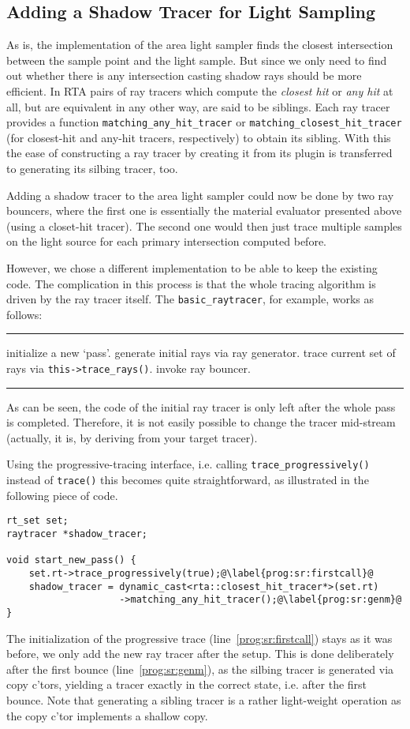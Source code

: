 \documentclass[a4paper,11pt]{scrartcl}
\newenvironment{alg}{
	\medskip\hrule
	\begin{algorithmic}}
	{\end{algorithmic}
	\hrule\medskip}
\begin{document}
\subsection{Adding a Shadow Tracer for Light Sampling}
As is, the implementation of the area light sampler finds the closest intersection between the sample point and the light sample.
But since we only need to find out whether there is any intersection casting shadow rays should be more efficient.
In RTA pairs of ray tracers which compute the \emph{closest hit} or \emph{any hit} at all, but are equivalent in any other way, are said to be siblings.
Each ray tracer provides a function \lstinline|matching_any_hit_tracer| or \lstinline|matching_closest_hit_tracer| 
	(for closest-hit and any-hit tracers, respectively) to obtain its sibling.
With this the ease of constructing a ray tracer by creating it from its plugin is transferred to generating its silbing tracer, too.

Adding a shadow tracer to the area light sampler could now be done by two ray bouncers, 
	where the first one is essentially the material evaluator presented above (using a closet-hit tracer).
The second one would then just trace multiple samples on the light source for each primary intersection computed before.

However, we chose a different implementation to be able to keep the existing code.
The complication in this process is that the whole tracing algorithm is driven by the ray tracer itself.
The \lstinline|basic_raytracer|, for example, works as follows:
\begin{alg}
\State initialize a new `pass'.
\State generate initial rays via ray generator.
\Repeat
	\State trace current set of rays via \lstinline|this->trace_rays()|.
	\State invoke ray bouncer.
\end{alg}
As can be seen, the code of the initial ray tracer is only left after the whole pass is completed.
Therefore, it is not easily possible to change the tracer mid-stream
	(actually, it is, by deriving from your target tracer).

Using the progressive-tracing interface, i.e. calling \lstinline|trace_progressively()| instead of \lstinline|trace()|
	this becomes quite straightforward, as illustrated in the following piece of code.
\begin{lstlisting}
rt_set set;
raytracer *shadow_tracer;

void start_new_pass() {
	set.rt->trace_progressively(true);@\label{prog:sr:firstcall}@
	shadow_tracer = dynamic_cast<rta::closest_hit_tracer*>(set.rt)
	                ->matching_any_hit_tracer();@\label{prog:sr:genm}@
}
\end{lstlisting}
The initialization of the progressive trace (line~\ref{prog:sr:firstcall}) stays as it was before,
	we only add the new ray tracer after the setup.
This is done deliberately after the first bounce (line~\ref{prog:sr:genm}), as the silbing tracer is generated via copy c'tors, 
	yielding a tracer exactly in the correct state, i.e. after the first bounce.
Note that generating a sibling tracer is a rather light-weight operation as the copy c'tor implements a shallow copy.
\end{document}
